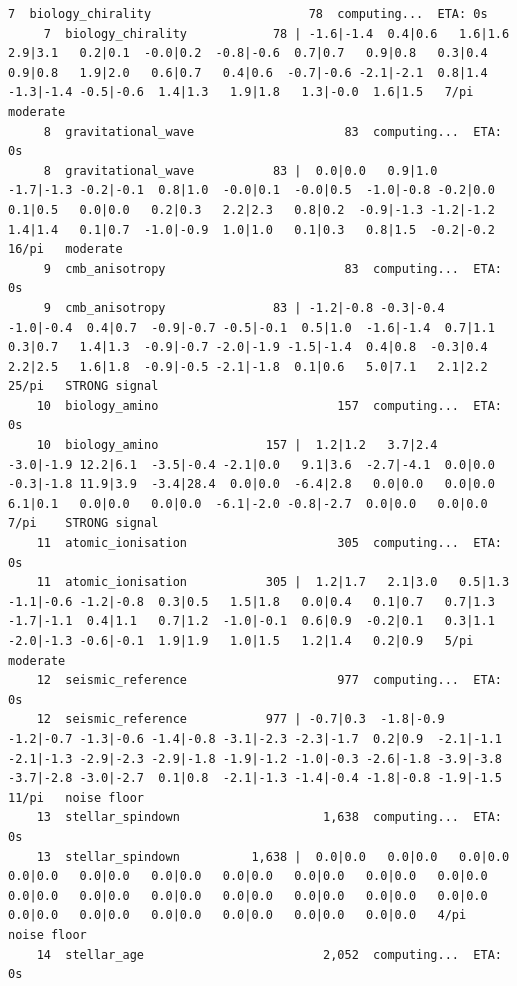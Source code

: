 \documentclass[11pt, letterpaper, openany]{book}
\begin{document}
\begin{empiricalbox}
\begin{lstlisting}[style=terminal]
     7  biology_chirality                      78  computing...  ETA: 0s
     7  biology_chirality            78 | -1.6|-1.4  0.4|0.6   1.6|1.6   2.9|3.1   0.2|0.1  -0.0|0.2  -0.8|-0.6  0.7|0.7   0.9|0.8   0.3|0.4   0.9|0.8   1.9|2.0   0.6|0.7   0.4|0.6  -0.7|-0.6 -2.1|-2.1  0.8|1.4  -1.3|-1.4 -0.5|-0.6  1.4|1.3   1.9|1.8   1.3|-0.0  1.6|1.5   7/pi    moderate
     8  gravitational_wave                     83  computing...  ETA: 0s
     8  gravitational_wave           83 |  0.0|0.0   0.9|1.0  -1.7|-1.3 -0.2|-0.1  0.8|1.0  -0.0|0.1  -0.0|0.5  -1.0|-0.8 -0.2|0.0   0.1|0.5   0.0|0.0   0.2|0.3   2.2|2.3   0.8|0.2  -0.9|-1.3 -1.2|-1.2  1.4|1.4   0.1|0.7  -1.0|-0.9  1.0|1.0   0.1|0.3   0.8|1.5  -0.2|-0.2  16/pi   moderate
     9  cmb_anisotropy                         83  computing...  ETA: 0s
     9  cmb_anisotropy               83 | -1.2|-0.8 -0.3|-0.4 -1.0|-0.4  0.4|0.7  -0.9|-0.7 -0.5|-0.1  0.5|1.0  -1.6|-1.4  0.7|1.1   0.3|0.7   1.4|1.3  -0.9|-0.7 -2.0|-1.9 -1.5|-1.4  0.4|0.8  -0.3|0.4   2.2|2.5   1.6|1.8  -0.9|-0.5 -2.1|-1.8  0.1|0.6   5.0|7.1   2.1|2.2   25/pi   STRONG signal
    10  biology_amino                         157  computing...  ETA: 0s
    10  biology_amino               157 |  1.2|1.2   3.7|2.4  -3.0|-1.9 12.2|6.1  -3.5|-0.4 -2.1|0.0   9.1|3.6  -2.7|-4.1  0.0|0.0  -0.3|-1.8 11.9|3.9  -3.4|28.4  0.0|0.0  -6.4|2.8   0.0|0.0   0.0|0.0   6.1|0.1   0.0|0.0   0.0|0.0  -6.1|-2.0 -0.8|-2.7  0.0|0.0   0.0|0.0   7/pi    STRONG signal
    11  atomic_ionisation                     305  computing...  ETA: 0s
    11  atomic_ionisation           305 |  1.2|1.7   2.1|3.0   0.5|1.3  -1.1|-0.6 -1.2|-0.8  0.3|0.5   1.5|1.8   0.0|0.4   0.1|0.7   0.7|1.3  -1.7|-1.1  0.4|1.1   0.7|1.2  -1.0|-0.1  0.6|0.9  -0.2|0.1   0.3|1.1  -2.0|-1.3 -0.6|-0.1  1.9|1.9   1.0|1.5   1.2|1.4   0.2|0.9   5/pi    moderate
    12  seismic_reference                     977  computing...  ETA: 0s
    12  seismic_reference           977 | -0.7|0.3  -1.8|-0.9 -1.2|-0.7 -1.3|-0.6 -1.4|-0.8 -3.1|-2.3 -2.3|-1.7  0.2|0.9  -2.1|-1.1 -2.1|-1.3 -2.9|-2.3 -2.9|-1.8 -1.9|-1.2 -1.0|-0.3 -2.6|-1.8 -3.9|-3.8 -3.7|-2.8 -3.0|-2.7  0.1|0.8  -2.1|-1.3 -1.4|-0.4 -1.8|-0.8 -1.9|-1.5  11/pi   noise floor
    13  stellar_spindown                    1,638  computing...  ETA: 0s
    13  stellar_spindown          1,638 |  0.0|0.0   0.0|0.0   0.0|0.0   0.0|0.0   0.0|0.0   0.0|0.0   0.0|0.0   0.0|0.0   0.0|0.0   0.0|0.0   0.0|0.0   0.0|0.0   0.0|0.0   0.0|0.0   0.0|0.0   0.0|0.0   0.0|0.0   0.0|0.0   0.0|0.0   0.0|0.0   0.0|0.0   0.0|0.0   0.0|0.0   4/pi    noise floor
    14  stellar_age                         2,052  computing...  ETA: 0s

\end{lstlisting}
\end{empiricalbox}
\end{document}
